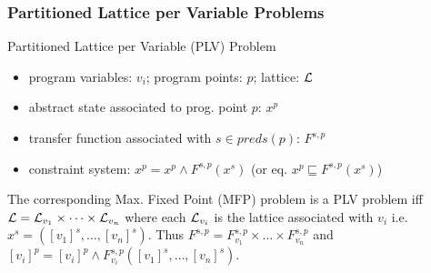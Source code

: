 \begin{frame}
\frametitle{Partitioned Lattice per Variable Problems}
\begin{exampleblock}{Partitioned Lattice per Variable (PLV) Problem}
\begin{itemize}
\item program variables: $v_i$; program points: $p$; lattice: $\cal L$\\
\item abstract state associated to prog. point $p$: $x^p$\\
\item transfer function associated with $s\in \textit{preds}(p)$: $F^{s,p}$\\
\item constraint system: $x^p = x^p \wedge F^{s,p}(x^s)$ (or eq. $x^p \sqsubseteq  F^{s,p}(x^s)$)\\
\end{itemize}
The corresponding Max. Fixed Point (MFP) problem is a PLV problem iff ${\cal L}={\cal L}_{v_1}\times \dots \times {\cal L}_{v_n}$ where each ${\cal L}_{v_i}$ is the lattice associated with $v_i$ i.e. $x^s=([v_1]^s,\dots,[v_n]^s)$. Thus $F^{s,p}=F^{s,p}_{v_1}\times \dots\times F^{s,p}_{v_n}$ and $[v_i]^p = [v_i]^p \wedge  F^{s,p}_{v_i}([v_1]^s,\dots,[v_n]^s)$.
\end{exampleblock}
\end{frame}


